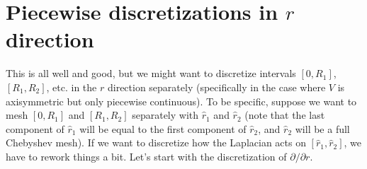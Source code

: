 \section{Piecewise discretizations in $r$ direction}
\label{sec-piecewise}

This is all well and good, but we might want to discretize
intervals $[0,R_1]$, $[R_1,R_2]$, etc. in the $r$ direction separately
(specifically in the case where $V$ is axisymmetric but only
piecewise continuous). To be specific, suppose we want to mesh $[0,R_1]$ and
$[R_1,R_2]$ separately with $\hat{r}_1$ and $\hat{r}_2$ (note that
the last component of $\hat{r}_1$ will be equal to the first
component of $\hat{r}_2$, and $\hat{r}_2$ will be a full Chebyshev
mesh). If we want to discretize how the Laplacian acts on
$[\hat{r}_1, \hat{r}_2]$, we have to rework things a bit. Let's start
with the discretization of $\partial/\partial r$.

